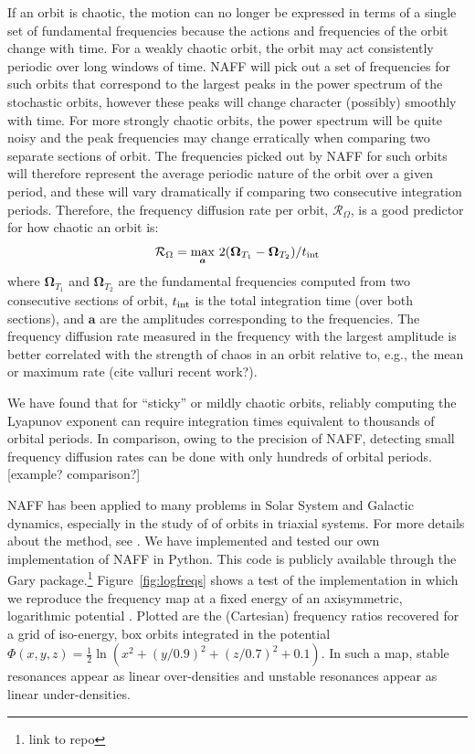 \documentclass[letterpaper,12pt,preprint]{aastex}
\newcommand{\bs}[1]{\boldsymbol{#1}}
\newcommand{\inttime}{t_{\rm int}}
\newcommand{\fdrate}{\mathcal{R}_\Omega}
\begin{document}
If an orbit is chaotic, the motion can no longer be expressed in terms of a single set of fundamental frequencies because the actions and frequencies of the orbit change with time. For a weakly chaotic orbit, the orbit may act consistently periodic over long windows of time. NAFF will pick out a set of frequencies for such orbits that correspond to the largest peaks in the power spectrum of the stochastic orbits, however these peaks will change character (possibly) smoothly with time. For more strongly chaotic orbits, the power spectrum will be quite noisy and the peak frequencies may change erratically when comparing two separate sections of orbit. The frequencies picked out by NAFF for such orbits will therefore represent the average periodic nature of the orbit over a given period, and these will vary dramatically if comparing two consecutive integration periods. Therefore, the frequency diffusion rate per orbit, $\fdrate$, is a good predictor for how chaotic an orbit is:
\begin{equation}
	\fdrate = \max_{\bs{a}}\,2(\bs{\Omega}_{T_1} - \bs{\Omega}_{T_2}) / \inttime \label{eq:fdrate}
\end{equation}
where $\bs{\Omega}_{T_1}$ and $\bs{\Omega}_{T_2}$ are the fundamental frequencies computed from two consecutive sections of orbit, $\inttime$ is the total integration time (over both sections), and $\bs{a}$ are the amplitudes corresponding to the frequencies. The frequency diffusion rate measured in the frequency with the largest amplitude is better correlated with the strength of chaos in an orbit relative to, e.g., the mean or maximum rate (cite valluri recent work?).

We have found that for ``sticky'' or mildly chaotic orbits, reliably computing the Lyapunov exponent can require integration times equivalent to thousands of orbital periods. In comparison, owing to the precision of NAFF, detecting small frequency diffusion rates can be done with only hundreds of orbital periods. [example? comparison?] 

NAFF has been applied to many problems in Solar System and Galactic dynamics, especially in the study of of orbits in triaxial systems. For more details about the method, see \cite{papaphilippou96, laskar, etc.}. We have implemented and tested our own implementation of NAFF in Python. This code is publicly available through the Gary package.\footnote{link to repo} Figure~\ref{fig:logfreqs} shows a test of the implementation in which we reproduce the frequency map at a fixed energy of an axisymmetric, logarithmic potential \cite[][pg. 260, Figure~3.45]{binneytremaine}. Plotted are the (Cartesian) frequency ratios recovered for a grid of iso-energy, box orbits integrated in the potential $\Phi(x,y,z) = \frac{1}{2}\ln\left(x^2 + (y/0.9)^2 + (z/0.7)^2 + 0.1\right)$. In such a map, stable resonances appear as linear over-densities and unstable resonances appear as linear under-densities. 
\end{document}
